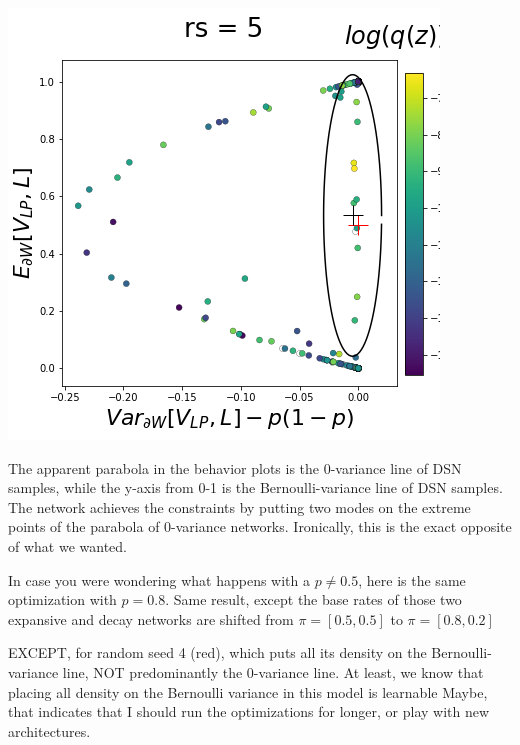 \documentclass[11pt]{article}
\begin{document}
\begin{center}
\includegraphics[scale=0.33]{figs/T_x_SC_full_c=0_p=50_rs=5.png}
\end{center}

The apparent parabola in the behavior plots is the 0-variance line of DSN samples, while the y-axis from 0-1 is the Bernoulli-variance line of DSN samples.  The network achieves the constraints by putting two modes on the extreme points of the parabola of 0-variance networks.  Ironically, this is the exact opposite of what we wanted.

In case you were wondering what happens with a $p \neq 0.5$, here is the same optimization with $p = 0.8$. Same result, except the base rates of those two expansive and decay networks are shifted from $\pi = \left[0.5, 0.5\right]$ to $\pi = \left[0.8, 0.2\right]$

EXCEPT, for random seed 4 (red), which puts all its density on the Bernoulli-variance line, NOT predominantly the 0-variance line.  At least, we know that placing all density on the Bernoulli variance in this model is learnable Maybe, that indicates that I should run the optimizations for longer, or play with new architectures.
\end{document}
